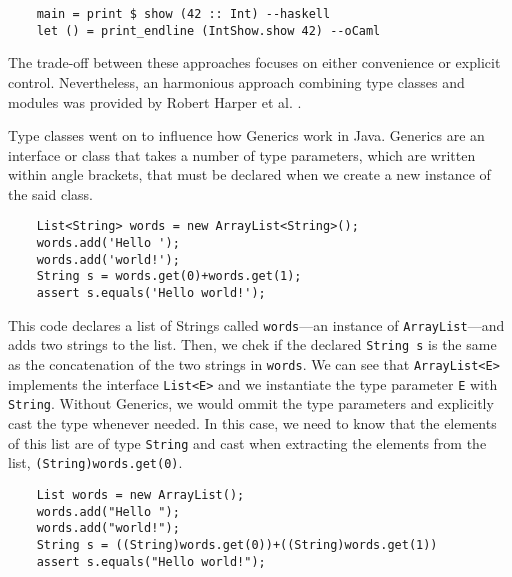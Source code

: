 \begin{lstlisting}
    main = print $ show (42 :: Int) --haskell
    let () = print_endline (IntShow.show 42) --oCaml
\end{lstlisting}

The trade-off between these approaches focuses on either convenience or explicit control. Nevertheless, an harmonious approach combining type classes and modules was provided by Robert Harper et al. .


Type classes went on to influence how Generics work in Java. Generics are an interface or class that takes a number of type parameters, which are written within angle brackets, that must be declared when we create a new instance of the said class.

\begin{lstlisting}
    List<String> words = new ArrayList<String>();
    words.add('Hello ');
    words.add('world!');
    String s = words.get(0)+words.get(1);
    assert s.equals('Hello world!');
\end{lstlisting}

This code declares a list of Strings called \lstinline|words|---an instance of \lstinline|ArrayList|---and adds two strings to the list. Then, we chek if the declared \lstinline|String s| is the same as the concatenation of the two strings in \lstinline|words|.
We can see that \lstinline|ArrayList<E>| implements the interface \lstinline|List<E>| and we instantiate the type parameter \lstinline|E| with \lstinline|String|. Without Generics, we would ommit the type parameters and explicitly cast the type whenever needed. In this case, we need to know that the elements of this list are of type \lstinline|String| and cast when extracting the elements from the list, \lstinline|(String)words.get(0)|.
\begin{lstlisting}
    List words = new ArrayList();
    words.add("Hello ");
    words.add("world!");
    String s = ((String)words.get(0))+((String)words.get(1)) 
    assert s.equals("Hello world!");
\end{lstlisting}



\LIMPA
